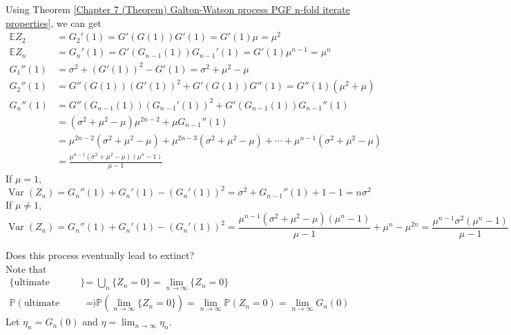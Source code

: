 \documentclass{huhtakm-template-book}
\newcommand{\prob}{\mathbb{P}}
\newcommand{\expect}{\mathbb{E}}
\DeclareMathOperator{\Var}{Var}
\begin{document}
\begin{proofing}
	Using Theorem \ref{Chapter 7 (Theorem) Galton-Watson process PGF n-fold iterate properties}, we can get
	\begin{align*}
		\expect Z_{2}&=G_{2}'(1)=G'(G(1))G'(1)=G'(1)\mu=\mu^{2}\\
		\expect Z_{n}&=G_{n}'(1)=G'(G_{n-1}(1))G_{n-1}'(1)=G'(1)\mu^{n-1}=\mu^{n}\\
		G_{1}''(1)&=\sigma^{2}+(G'(1))^{2}-G'(1)=\sigma^{2}+\mu^{2}-\mu\\
		G_{2}''(1)&=G''(G(1))(G'(1))^{2}+G'(G(1))G''(1)=G''(1)(\mu^{2}+\mu)\\
		G_{n}''(1)&=G''(G_{n-1}(1))(G_{n-1}'(1))^{2}+G'(G_{n-1}(1))G_{n-1}''(1)\\
		&=(\sigma^{2}+\mu^{2}-\mu)\mu^{2n-2}+\mu G_{n-1}''(1)\\
		&=\mu^{2n-2}(\sigma^{2}+\mu^{2}-\mu)+\mu^{2n-3}(\sigma^{2}+\mu^{2}-\mu)+\cdots+\mu^{n-1}(\sigma^{2}+\mu^{2}-\mu)\\
		&=\frac{\mu^{n-1}(\sigma^{2}+\mu^{2}-\mu)(\mu^{n}-1)}{\mu-1}
	\end{align*}
	If $\mu=1$,
	\begin{equation*}
		\Var(Z_{n})=G_{n}''(1)+G_{n}'(1)-(G_{n}'(1))^{2}=\sigma^{2}+G_{n-1}''(1)+1-1=n\sigma^{2}
	\end{equation*}
	If $\mu\neq 1$,
	\begin{equation*}
		\Var(Z_{n})=G_{n}''(1)+G_{n}'(1)-(G_{n}'(1))^{2}=\frac{\mu^{n-1}(\sigma^{2}+\mu^{2}-\mu)(\mu^{n}-1)}{\mu-1}+\mu^{n}-\mu^{2n}=\frac{\mu^{n-1}\sigma^{2}(\mu^{n}-1)}{\mu-1}
	\end{equation*}
\end{proofing}
\begin{eg}
	Does this process eventually lead to extinct?\\
	Note that
	\begin{align*}
		\{\text{ultimate extinction}\}&=\bigcup_{n}\{Z_{n}=0\}=\lim_{n\to\infty}\{Z_{n}=0\}\\
		\prob(\text{ultimate extinction})&=\prob\left(\lim_{n\to\infty}\{Z_{n}=0\}\right)=\lim_{n\to\infty}\prob(Z_{n}=0)=\lim_{n\to\infty}G_{n}(0)
	\end{align*}
	Let $\eta_{n}=G_{n}(0)$ and $\eta=\lim_{n\to\infty}\eta_{n}$.
\end{eg}
\end{document}
